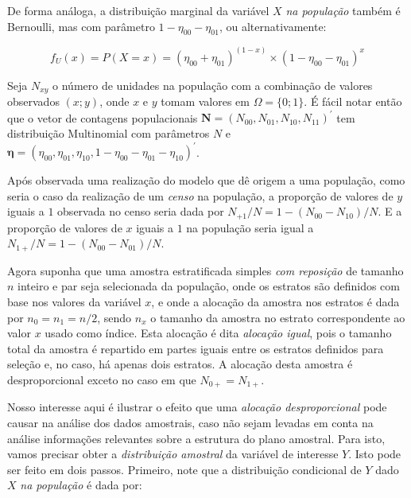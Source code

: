\documentclass[
  12pt,
  brazilian,
]{book}
\theoremstyle{definition}
\theoremstyle{definition}
\theoremstyle{definition}
\theoremstyle{definition}
\theoremstyle{remark}
\begin{document}
De forma análoga, a distribuição marginal da variável \(X\) \emph{na população} também
é Bernoulli, mas com parâmetro \(1 - \eta_{00} - \eta_{01}\), ou alternativamente:

\begin{equation}
 f_U (x) = P( X = x ) = (\eta_{00} + \eta_{01})^{(1-x)} \times (1 - \eta_{00} - \eta_{01})^x\nonumber
\end{equation}

Seja \(N_{xy}\) o número de unidades na população com a combinação de valores
observados \((x;y)\), onde \(x\) e \(y\) tomam valores em \(\Omega = \{ 0 ; 1 \}\). É
fácil notar então que o vetor de contagens populacionais \(\mathbf{N} = ( N_{00}, N_{01}, N_{10}, N_{11} )^{\prime}\) tem distribuição Multinomial com parâmetros
\(N\) e \(\mathbf{\eta} = (\eta_{00} , \eta_{01} , \eta_{10} , 1 - \eta_{00} - \eta_{01} - \eta_{10} )^{\prime}\).

Após observada uma realização do modelo que dê origem a uma população, como
seria o caso da realização de um \emph{censo} na população, a proporção de valores de
\(y\) iguais a \(1\) observada no censo seria dada por \(N_{+1} / N = 1 - (N_{00} - N_{10})/N\).
E a proporção de valores de \(x\) iguais a \(1\) na população seria igual a \(N_{1+} / N = 1 - (N_{00} - N_{01})/N\).

Agora suponha que uma amostra estratificada simples \emph{com reposição} de tamanho
\(n\) inteiro e par seja selecionada da população, onde os estratos são definidos
com base nos valores da variável \(x\), e onde a alocação da amostra nos estratos
é dada por \(n_0 = n_1 = n/2\), sendo \(n_x\) o tamanho da amostra no estrato
correspondente ao valor \(x\) usado como índice. Esta alocação é dita \emph{alocação igual},
pois o tamanho total da amostra é repartido em partes iguais entre os estratos
definidos para seleção e, no caso, há apenas dois estratos. A alocação
desta amostra é desproporcional exceto no caso em que \(N_{0+} = N_{1+}\).

Nosso interesse aqui é ilustrar o efeito que uma \emph{alocação desproporcional} pode
causar na análise dos dados amostrais, caso não sejam levadas em conta na
análise informações relevantes sobre a estrutura do plano amostral. Para isto,
vamos precisar obter a \emph{distribuição amostral} da variável de interesse \(Y\).
Isto pode ser feito em dois passos. Primeiro, note que a distribuição
condicional de \(Y\) dado \(X\) \emph{na população} é dada por:
\end{document}
